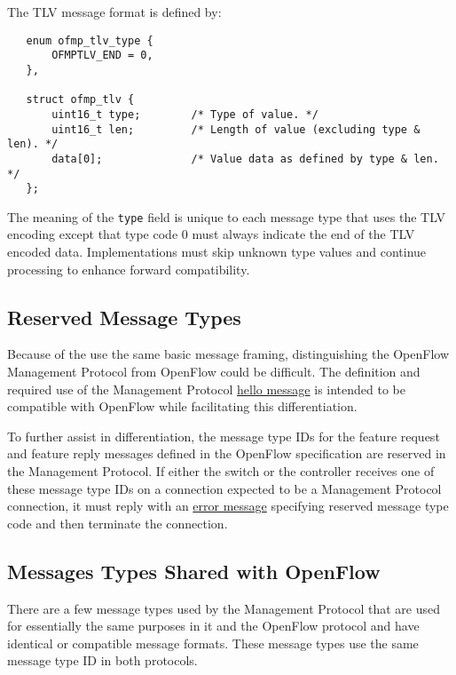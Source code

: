 \documentclass[11pt,a4paper]{article}
\begin{document}
   The TLV message format is defined by:

{ \footnotesize

\begin{verbatim}
   enum ofmp_tlv_type {
       OFMPTLV_END = 0,
   },

   struct ofmp_tlv {
       uint16_t type;        /* Type of value. */
       uint16_t len;         /* Length of value (excluding type & len). */
       data[0];              /* Value data as defined by type & len.  */
   };

\end{verbatim}


}

   The meaning of the \verb|type| field is unique to each message type
   that uses the TLV encoding except that type code 0 must always
   indicate the end of the TLV encoded data.  Implementations must
   skip unknown type values and continue processing to enhance
   forward compatibility.

\subsection{Reserved Message Types}
\label{sec-2.5}


   Because of the use the same basic message framing, distinguishing
   the OpenFlow Management Protocol from OpenFlow could be
   difficult.  The definition and required use of the Management
   Protocol \hyperref[sec-2.6.1]{hello message} is intended to be compatible with
   OpenFlow while facilitating this differentiation.

   To further assist in differentiation, the message type IDs for the
   feature request and feature reply messages defined in the OpenFlow
   specification are reserved in the Management Protocol.
   If either the switch or the controller receives one of these
   message type IDs on a connection expected to be a Management
   Protocol connection, it must reply with an \hyperref[sec-2.6.5]{error message}
   specifying reserved message type code and then terminate the
   connection.

\subsection{Messages Types Shared with OpenFlow}
\label{sec-2.6}


   There are a few message types used by the Management
   Protocol that are used for essentially the same purposes in it and
   the OpenFlow protocol and have identical or compatible message
   formats.  These message types use the same message type ID in both
   protocols.
\end{document}
